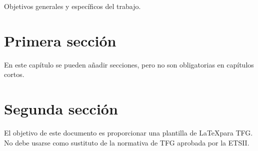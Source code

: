 Objetivos generales y específicos del trabajo.


\section{Primera sección}

En este capítulo se pueden añadir secciones, pero no son obligatorias en capítulos cortos.

\section{Segunda sección}

El objetivo de este documento es proporcionar una plantilla de \LaTeX para TFG. No debe usarse como sustituto de la normativa de TFG aprobada por la ETSII.

